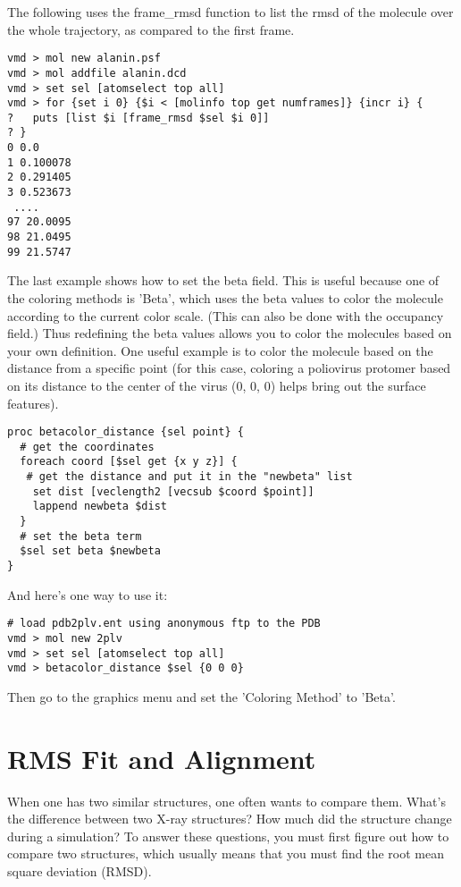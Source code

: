The following uses the frame\_rmsd function to list the rmsd of the
molecule over the whole trajectory, as compared to the first frame.
\begin{verbatim}
vmd > mol new alanin.psf 
vmd > mol addfile alanin.dcd
vmd > set sel [atomselect top all]
vmd > for {set i 0} {$i < [molinfo top get numframes]} {incr i} {
?   puts [list $i [frame_rmsd $sel $i 0]]
? }
0 0.0
1 0.100078
2 0.291405
3 0.523673
 ....
97 20.0095
98 21.0495
99 21.5747
\end{verbatim}

The last example shows how to set the beta field.
This is
useful because one of the coloring methods is 'Beta', which uses the
beta values to color the molecule according to the current color
scale.  (This can also be done with the occupancy field.)  Thus
redefining the beta values allows you to color the molecules based on
your own definition.  One useful example is to color the molecule
based on the distance from a specific point (for this case, coloring a
poliovirus protomer based on its distance to the center of the virus
(0, 0, 0) helps bring out the surface features).

\begin{verbatim}
proc betacolor_distance {sel point} {
  # get the coordinates
  foreach coord [$sel get {x y z}] {
   # get the distance and put it in the "newbeta" list
    set dist [veclength2 [vecsub $coord $point]]
    lappend newbeta $dist
  } 
  # set the beta term
  $sel set beta $newbeta
} 
\end{verbatim}
And here's one way to use it:

\begin{verbatim}
# load pdb2plv.ent using anonymous ftp to the PDB
vmd > mol new 2plv
vmd > set sel [atomselect top all]
vmd > betacolor_distance $sel {0 0 0}
\end{verbatim}
Then go to the graphics menu and set the 'Coloring Method' to 'Beta'.

\section{RMS Fit and Alignment}
\label{ug:fit}

When one has two similar structures, one often wants to compare them.
What's the difference between two X-ray structures?  How much did the
structure change during a simulation?  To answer these questions, you
must first figure out how to compare two structures, which usually
means that you must find the root mean square deviation (RMSD).

